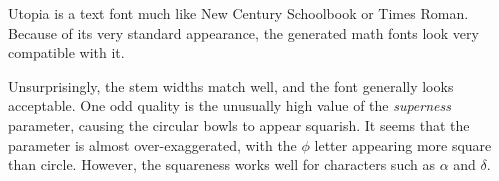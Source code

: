 
Utopia is a text font much like New Century Schoolbook or Times Roman. Because
of its very standard appearance, the generated math fonts look very compatible
with it.

Unsurprisingly, the stem widths match well, and the font generally looks
acceptable. One odd quality is the unusually high value of the \emph{superness}
parameter, causing the circular bowls to appear squarish. It seems that the
parameter is almost over-exaggerated, with the $\phi$ letter appearing more
square than circle. However, the squareness works well for characters such as
$\alpha$ and $\delta$.
